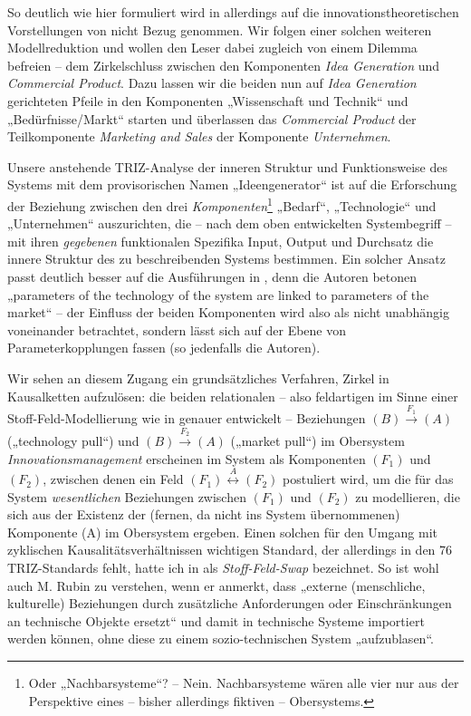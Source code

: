 \documentclass[11pt,a4paper]{article}
\begin{document}
So deutlich wie hier formuliert wird in \cite{TESE2018} allerdings auf die
innovationstheoretischen Vorstellungen von \cite{Preez2006} nicht Bezug
genommen.  Wir folgen einer solchen weiteren Modellreduktion und wollen den
Leser dabei zugleich von einem Dilemma befreien -- dem Zirkelschluss zwischen
den Komponenten \emph{Idea Generation} und \emph{Commercial Product}.  Dazu
lassen wir die beiden nun auf \emph{Idea Generation} gerichteten Pfeile in den
Komponenten „Wissenschaft und Technik“ und „Bedürfnisse/Markt“ starten und
überlassen das \emph{Commercial Product} der Teilkomponente \emph{Marketing
  and Sales} der Komponente \emph{Unternehmen}.

Unsere anstehende TRIZ-Analyse der inneren Struktur und Funktionsweise des
Systems mit dem provisorischen Namen „Ideengenerator“ ist auf die Erforschung
der Beziehung zwischen den drei \emph{Komponenten}\footnote{Oder
  „Nachbarsysteme“?  -- Nein. Nachbarsysteme wären alle vier nur aus der
  Perspektive eines -- bisher allerdings fiktiven -- Obersystems.} „Bedarf“,
„Technologie“ und „Unternehmen“ auszurichten, die -- nach dem oben
entwickelten Systembegriff -- mit ihren \emph{gegebenen} funktionalen
Spezifika Input, Output und Durchsatz die innere Struktur des zu
beschreibenden Systems bestimmen.  Ein solcher Ansatz passt deutlich besser
auf die Ausführungen in \cite[Kap. 1]{TESE2018}, denn die Autoren betonen
„parameters of the technology of the system are linked to parameters of the
market“ -- der Einfluss der beiden Komponenten wird also als nicht unabhängig
voneinander betrachtet, sondern lässt sich auf der Ebene von
Parameterkopplungen fassen (so jedenfalls die Autoren).

Wir sehen an diesem Zugang ein grundsätzliches Verfahren, Zirkel in
Kausalketten aufzulösen: die beiden relationalen -- also feldartigen im Sinne
einer Stoff-Feld-Modellierung wie in \cite[Kap. 4.9]{KS2017} genauer
entwickelt -- Beziehungen $(B)\stackrel{F_1}{\longrightarrow} (A)$
(„technology pull“) und $(B) \stackrel{F_2}{\longrightarrow} (A)$ („market
pull“) im Obersystem \emph{Innovationsmanagement} erscheinen im System als
Komponenten $(F_1)$ und $(F_2)$, zwischen denen ein Feld
$(F_1)\stackrel{A}{\longleftrightarrow}(F_2)$ postuliert wird, um die für das
System \emph{wesentlichen} Beziehungen zwischen $(F_1)$ und $(F_2)$ zu
modellieren, die sich aus der Existenz der (fernen, da nicht ins System
übernommenen) Komponente (A) im Obersystem ergeben.  Einen solchen für den
Umgang mit zyklischen Kausalitätsverhältnissen wichtigen Standard, der
allerdings in den 76 TRIZ-Standards fehlt, hatte ich in \cite{Graebe2019a} als
\emph{Stoff-Feld-Swap} bezeichnet.  So ist wohl auch M. Rubin zu verstehen,
wenn er anmerkt, dass „externe (menschliche, kulturelle) Beziehungen durch
zusätzliche Anforderungen oder Einschränkungen an technische Objekte ersetzt“
und damit in technische Systeme importiert werden können, ohne diese zu einem
sozio-technischen System „aufzublasen“.
\end{document}
